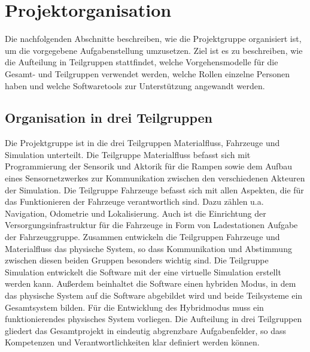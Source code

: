 \section{Projektorganisation}
Die nachfolgenden Abschnitte beschreiben, wie die Projektgruppe organisiert ist, um die vorgegebene Aufgabenstellung umzusetzen. Ziel ist es zu beschreiben, wie die Aufteilung in Teilgruppen stattfindet, welche Vorgehensmodelle für die Gesamt- und Teilgruppen verwendet werden, welche Rollen einzelne Personen haben und welche Softwaretools zur Unterstützung angewandt werden.   
\subsection{Organisation in drei Teilgruppen}
Die Projektgruppe ist in die drei Teilgruppen Materialfluss, Fahrzeuge und Simulation unterteilt. Die Teilgruppe Materialfluss befasst sich mit Programmierung der Sensorik und Aktorik für die Rampen sowie dem Aufbau eines Sensornetzwerkes zur Kommunikation zwischen den verschiedenen Akteuren der Simulation. Die Teilgruppe Fahrzeuge befasst sich mit allen Aspekten, die für das Funktionieren der Fahrzeuge verantwortlich sind. Dazu zählen u.a. Navigation, Odometrie und Lokalisierung. Auch ist die Einrichtung der Versorgungsinfrastruktur für die Fahrzeuge in Form von Ladestationen Aufgabe der Fahrzeuggruppe. Zusammen entwickeln die Teilgruppen Fahrzeuge und Materialfluss das physische System, so dass Kommunikation und Abstimmung zwischen diesen beiden Gruppen besonders wichtig sind. Die Teilgruppe Simulation entwickelt die Software mit der eine virtuelle Simulation erstellt werden kann. Außerdem beinhaltet die Software einen hybriden Modus, in dem das physische System auf die Software abgebildet wird und beide Teilsysteme ein Gesamtsystem bilden. Für die Entwicklung des Hybridmodus muss ein funktionierendes physisches System vorliegen. Die Aufteilung in drei Teilgruppen gliedert das Gesamtprojekt in eindeutig abgrenzbare Aufgabenfelder, so dass Kompetenzen und Verantwortlichkeiten klar definiert werden können.

